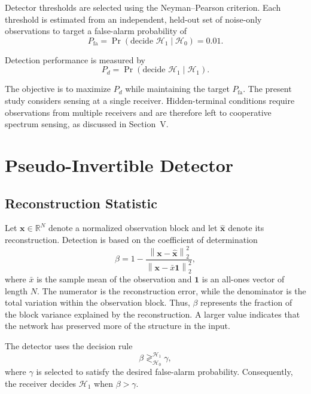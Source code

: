 \documentclass[conference]{IEEEtran}
\begin{document}
Detector thresholds are selected using the Neyman--Pearson criterion. Each threshold is estimated from an independent, held-out set of noise-only observations to target a false-alarm probability of
\begin{equation}
P_{\mathrm{fa}}
=
\Pr\!\left(
\text{decide } \mathcal{H}_1
\mid
\mathcal{H}_0
\right)
=
0.01.
\label{eq:pfa}
\end{equation}

Detection performance is measured by
\begin{equation}
P_d
=
\Pr\!\left(
\text{decide } \mathcal{H}_1
\mid
\mathcal{H}_1
\right).
\label{eq:pd}
\end{equation}

The objective is to maximize $P_d$ while maintaining the target $P_{\mathrm{fa}}$. The present study considers sensing at a single receiver. Hidden-terminal conditions require observations from multiple receivers and are therefore left to cooperative spectrum sensing, as discussed in Section~V.

\section{Pseudo-Invertible Detector}
\label{sec:proposed_method}

\subsection{Reconstruction Statistic}
\label{subsec:reconstruction_statistic}
Let $\mathbf{x}\in\mathbb{R}^{N}$ denote a normalized observation block and let $\hat{\mathbf{x}}$ denote its reconstruction. Detection is based on the coefficient of determination
\begin{equation}
\beta
=
1-
\frac{
\left\lVert \mathbf{x}-\hat{\mathbf{x}}\right\rVert_2^2
}{
\left\lVert \mathbf{x}-\bar{x}\mathbf{1}\right\rVert_2^2
},
\label{eq:beta_statistic}
\end{equation}
where $\bar{x}$ is the sample mean of the observation and $\mathbf{1}$ is an all-ones vector of length $N$. The numerator is the reconstruction error, while the denominator is the total variation within the observation block. Thus, $\beta$ represents the fraction of the block variance explained by the reconstruction. A larger value indicates that the network has preserved more of the structure in the input.

The detector uses the decision rule
\begin{equation}
\beta
\mathop{\gtrless}_{\mathcal{H}_0}^{\mathcal{H}_1}
\gamma,
\label{eq:beta_decision_rule}
\end{equation}
where $\gamma$ is selected to satisfy the desired false-alarm probability. Consequently, the receiver decides $\mathcal{H}_1$ when $\beta>\gamma$.
\end{document}
